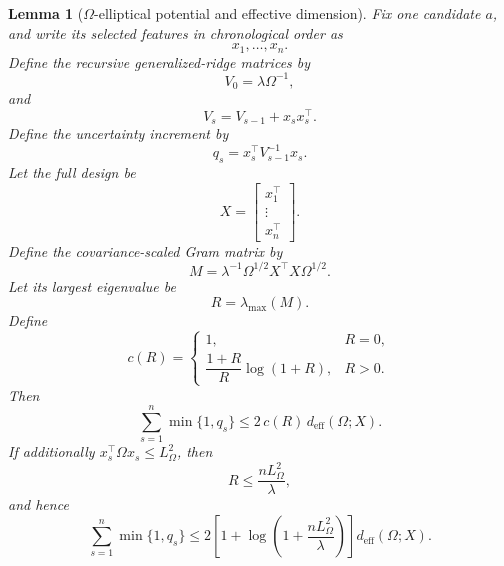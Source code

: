 \documentclass{article} %
\newtheorem{lemma}[theorem]{Lemma}
\begin{document}
\begin{lemma}[\(\Omega\)-elliptical potential and effective dimension]
\label{lem:hyper-elliptical}
Fix one candidate \(a\), and write its selected features in chronological order as
\begin{equation}
\label{eq:hyper-elliptical-features}
x_1,\ldots,x_n .
\end{equation}
Define the recursive generalized-ridge matrices by
\begin{equation}
\label{eq:hyper-elliptical-V0}
V_0=\lambda\Omega^{-1},
\end{equation}
and
\begin{equation}
\label{eq:hyper-elliptical-Vs}
V_s=V_{s-1}+x_sx_s^\top .
\end{equation}
Define the uncertainty increment by
\begin{equation}
\label{eq:hyper-elliptical-qs}
q_s=x_s^\top V_{s-1}^{-1}x_s .
\end{equation}
Let the full design be
\begin{equation}
\label{eq:hyper-elliptical-X}
X=
\begin{bmatrix}
x_1^\top\\
\vdots\\
x_n^\top
\end{bmatrix}.
\end{equation}
Define the covariance-scaled Gram matrix by
\begin{equation}
\label{eq:hyper-elliptical-M}
M=
\lambda^{-1}\Omega^{1/2}X^\top X\Omega^{1/2}.
\end{equation}
Let its largest eigenvalue be
\begin{equation}
\label{eq:hyper-elliptical-R}
R=\lambda_{\max}(M).
\end{equation}
Define
\begin{equation}
\label{eq:hyper-elliptical-cR}
c(R)=
\begin{cases}
1, & R=0,\\[2mm]
\dfrac{1+R}{R}\log(1+R), & R>0 .
\end{cases}
\end{equation}
Then
\begin{equation}
\label{eq:hyper-elliptical-main}
\sum_{s=1}^n \min\{1,q_s\}
\le
2\,c(R)\,d_{\mathrm{eff}}(\Omega;X).
\end{equation}
If additionally \(x_s^\top\Omega x_s\le L_{\Omega}^2\), then
\begin{equation}
\label{eq:hyper-elliptical-radius}
R\le \frac{nL_{\Omega}^2}{\lambda},
\end{equation}
and hence
\begin{equation}
\label{eq:hyper-elliptical-logT}
\sum_{s=1}^n \min\{1,q_s\}
\le
2
\left[
1+
\log\!\left(1+\frac{nL_{\Omega}^2}{\lambda}\right)
\right]
d_{\mathrm{eff}}(\Omega;X).
\end{equation}
\end{lemma}
\end{document}
